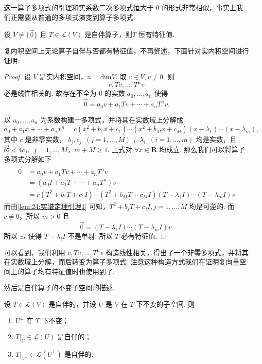 这一算子多项式的引理和实系数二次多项式恒大于 0 的形式非常相似，事实上我们正需要从普通的多项式演变到算子多项式.

\begin{lemma} \label{lem:24:实谱定理引理2}
    设 $ V \neq \{ \vec{0} \} $ 且 $ T \in \mathcal{L}(V) $ 是自伴算子，则$ T $ 恒有特征值.
\end{lemma}

复内积空间上无论算子自伴与否都有特征值，不再赘述，下面针对实内积空间进行证明.

\begin{proof}
    设 $ V $ 是实内积空间，$ n = \mathrm{dim} V $. 取 $ v \in V, v \neq 0 $. 则
    \[ v, Tv, \ldots , T^nv \]
    必是线性相关的. 故存在不全为 0 的实数 $ a_0, \ldots , a_n $ 使得
    \[ \vec{0} = a_0v + a_1Tv + \cdots + a_nT^nv. \]

    以 $ a_0, \ldots , a_n $ 为系数构建一多项式，并将其在实数域上分解成
    \[ a_0 + a_1x + \cdots + a_nx^n  = c(x^2 + b_1x + c_1)\cdots(x^2 + b_Mx + c_M)(x - \lambda_1)\cdots(x - \lambda_m), \]
    其中 $ c $ 是非零实数， $ b_j, c_j \enspace(j = 1, \ldots , M) $ ，$ \lambda_i \enspace(i = 1, \ldots , m) $ 均是实数，且 $ b_j^2 < 4c_j ,\enspace j = 1, \ldots , M $，$ m + M \geqslant 1 $. 上式对 $ \forall x \in \mathbf{R} $ 均成立. 那么我们可以将算子多项式分解如下
    \begin{align*}
        \vec{0} & = a_0v + a_1Tv + \cdots + a_nT^nv                                                      \\
                & = (a_0I + a_1T + \cdots + a_nT^n)v                                                     \\
                & = c(T^2 + b_1T + c_1I)\cdots(T^2 + b_MT + c_MI)(T - \lambda_1I)\cdots(T - \lambda_mI)v
    \end{align*}
    而由\autoref{lem:24:实谱定理引理1} 可知，$ T^2 + b_jT + c_jI, j = 1, \ldots , M $ 均是可逆的. 而 $ c \neq 0 $，所以 $ m > 0 $ 且
    \[ \vec{0} = (T - \lambda_1I)\cdots(T - \lambda_mI)v. \]
    所以 $ \exists i $ 使得 $ T - \lambda_iI $ 不是单射. 所以 $ T $ 必有特征值.
\end{proof}

可以看到，我们利用 $ v, Tv, \ldots , T^nv $ 构造线性相关，得出了一个非零多项式，并将其在实数域上分解，而后转变为算子多项式. 注意这种构造方式我们在证明复向量空间上的算子均有特征值时也使用到了.

然后是自伴算子的不变子空间的描述.

\begin{lemma} \label{lem:24:实谱定理引理3}
    设 $ T \in \mathcal{L}(V) $ 是自伴的，并设 $ U $ 是 $ V $ 在 $ T $ 下不变的子空间. 则
    \begin{enumerate}
        \item $ U^{\perp} $ 在 $ T $ 下不变；

        \item $ T|_U \in \mathcal{L}(U) $ 是自伴的；

        \item $ T|_{U^{\perp }} \in \mathcal{L}(U^{\perp }) $ 是自伴的.
    \end{enumerate}
\end{lemma}

